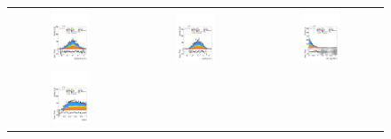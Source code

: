 \begin{figure}[htbp]
\begin{tabular}{@{}c c c@{}}
    \includegraphics[width=0.33\textwidth]{images/plots_modelling_run2_run3_variables/run_2_tth/plot_jet_1_eta_hh_tth_15_16_17_18.pdf} &
    \includegraphics[width=0.33\textwidth]{images/plots_modelling_run2_run3_variables/run_2_tth/plot_jet_0_eta_hh_tth_15_16_17_18.pdf} &
    \includegraphics[width=0.33\textwidth]{images/plots_modelling_run2_run3_variables/run_2_tth/plot_ditau_met_min_dphi_hh_tth_15_16_17_18.pdf} \\[4pt]
    \includegraphics[width=0.33\textwidth]{images/plots_modelling_run2_run3_variables/run_2_tth/plot_ratio01_hh_tth_15_16_17_18.pdf} &

\end{tabular}
\end{figure}
